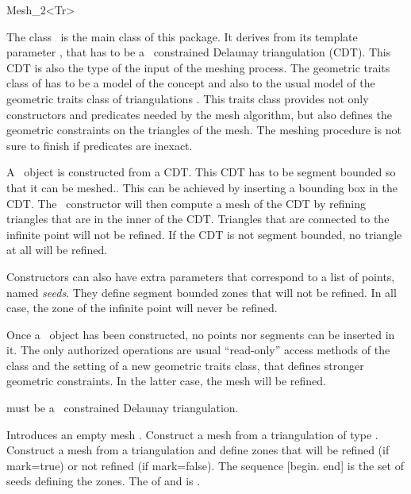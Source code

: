 \begin{ccRefClass}{Mesh_2<Tr>}

The class \ccRefName\ is the main class of this package. It derives
from its template parameter , that has to be a \cgal\ 
constrained Delaunay triangulation (CDT). This CDT is also the type of
the input of the meshing process. The geometric traits class of
 has to be a model of the concept  and also
to the usual model of the geometric traits class of triangulations
\ccc{Tr}. This traits class provides not only constructors and
predicates needed by the mesh algorithm, but also defines the geometric 
constraints on the triangles of the mesh. The meshing procedure is not 
sure to finish if predicates are inexact.

A \ccRefName\ object is constructed from a 
CDT. This CDT has to be segment bounded so that it can be
meshed.. This can be achieved by inserting a bounding box in the
CDT. The \ccRefName\ constructor will then compute a mesh of the CDT
by refining triangles that are in the inner of the CDT. Triangles that 
are connected to the infinite point will not be refined. If the CDT is 
not segment bounded, no triangle at all will be refined.

Constructors can also have extra parameters that correspond to a list
of points, named \textit{seeds}. They define segment bounded zones
that will not be refined. In all case, the zone of the infinite point
will never be refined.

Once a \ccRefName\ object has been constructed, no points nor segments
can be inserted in it. The only authorized operations are usual
``read-only'' access methods of the class  and the setting of
a new geometric traits class, that defines stronger geometric
constraints. In the latter case, the mesh will be refined.


\ccInheritsFrom


\ccRequirements

 must be a \cgal\ constrained Delaunay triangulation.

\ccTypes 
{}

\ccCreation
{}

{Introduces an empty mesh \ccVar.}
{Construct a mesh from a triangulation \ccc{t} of type \ccc{Tr}.}
{Construct a mesh from a triangulation \ccc{t} and define zones that
  will be refined (if mark=true) or not refined (if
  mark=false). The sequence [begin. end] is the set of seeds defining
  the zones.
  \ccPrecond The  of  and 
  is .}


\end{ccRefClass}
